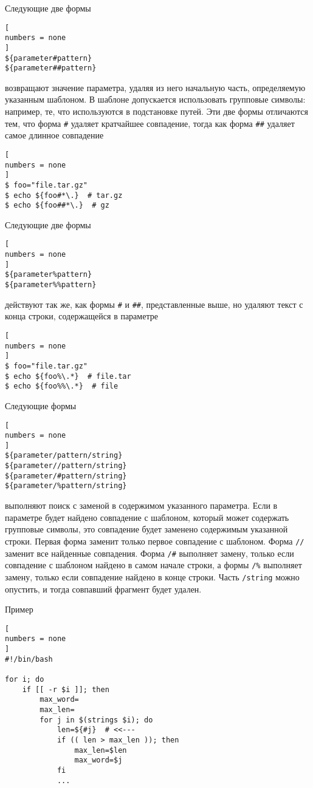 \documentclass[%
	11pt,
	a4paper,
	utf8,
		]{article}
\begin{document}
Следующие две формы
\begin{lstlisting}[
numbers = none
]
${parameter#pattern}
${parameter##pattern}
\end{lstlisting}
возвращают значение параметра, удаляя из него начальную часть, определяемую указанным шаблоном. В шаблоне допускается использовать групповые символы: например, те, что используются в подстановке путей. Эти две формы отличаются тем, что форма \verb|#| удаляет кратчайшее совпадение, тогда как форма \verb|##| удаляет самое длинное совпадение
\begin{lstlisting}[
numbers = none
]
$ foo="file.tar.gz"
$ echo ${foo#*\.}  # tar.gz
$ echo ${foo##*\.}  # gz
\end{lstlisting}

Следующие две формы
\begin{lstlisting}[
numbers = none
]
${parameter%pattern}
${parameter%%pattern}
\end{lstlisting}
действуют так же, как формы \verb|#| и \verb|##|, представленные выше, но удаляют текст с конца строки, содержащейся в параметре
\begin{lstlisting}[
numbers = none
]
$ foo="file.tar.gz"
$ echo ${foo%\.*}  # file.tar
$ echo ${foo%%\.*}  # file
\end{lstlisting}

Следующие формы
\begin{lstlisting}[
numbers = none
]
${parameter/pattern/string}
${parameter//pattern/string}
${parameter/#pattern/string}
${parameter/%pattern/string}
\end{lstlisting}
выполняют поиск с заменой в содержимом указанного параметра. Если в параметре будет найдено совпадение с шаблоном, который может содержать групповые символы, это совпадение будет заменено содержимым указанной строки. Первая форма заменит только первое совпадение с шаблоном. Форма \verb|//| заменит все найденные совпадения. Форма \verb|/#| выполняет замену, только если совпадение с шаблоном найдено в самом начале строки, а формы \verb|/%| выполняет замену, только если совпадение найдено в конце строки. Часть \verb|/string| можно опустить, и тогда совпавший фрагмент будет удален.

Пример
\begin{lstlisting}[
numbers = none
]
#!/bin/bash

for i; do
    if [[ -r $i ]]; then
        max_word=
        max_len=
        for j in $(strings $i); do
            len=${#j}  # <<---
            if (( len > max_len )); then
                max_len=$len
                max_word=$j
            fi
            ...
\end{lstlisting}
\end{document}
